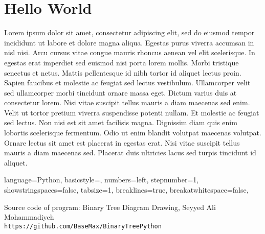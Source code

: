 \documentclass{article}
\begin{document}
\section{Hello World} 


Lorem ipsum dolor sit amet, consectetur adipiscing elit, sed do eiusmod tempor incididunt ut labore et dolore magna aliqua. Egestas purus viverra accumsan in nisl nisi. Arcu cursus vitae congue mauris rhoncus aenean vel elit scelerisque. In egestas erat imperdiet sed euismod nisi porta lorem mollis. Morbi tristique senectus et netus. Mattis pellentesque id nibh tortor id aliquet lectus proin. Sapien faucibus et molestie ac feugiat sed lectus vestibulum. Ullamcorper velit sed ullamcorper morbi tincidunt ornare massa eget. Dictum varius duis at consectetur lorem. Nisi vitae suscipit tellus mauris a diam maecenas sed enim. Velit ut tortor pretium viverra suspendisse potenti nullam. Et molestie ac feugiat sed lectus. Non nisi est sit amet facilisis magna. Dignissim diam quis enim lobortis scelerisque fermentum. Odio ut enim blandit volutpat maecenas volutpat. Ornare lectus sit amet est placerat in egestas erat. Nisi vitae suscipit tellus mauris a diam maecenas sed. Placerat duis ultricies lacus sed turpis tincidunt id aliquet.

\lstset
{
    language=Python,
    basicstyle=\footnotesize,
    numbers=left,
    stepnumber=1,
    showstringspaces=false,
    tabsize=1,
    breaklines=true,
    breakatwhitespace=false,
}




\medskip

\begin{thebibliography}{9}

\bibitem{} 
Source code of program: Binary Tree Diagram Drawing, Seyyed Ali Mohammadiyeh
\\\texttt{https://github.com/BaseMax/BinaryTreePython}
\end{thebibliography}
\end{document}
